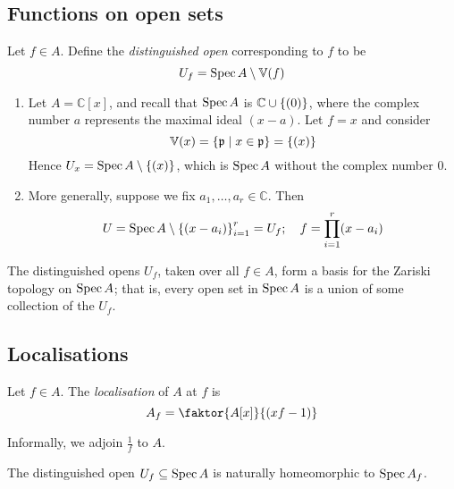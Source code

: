 \subsection{Functions on open sets}
\begin{definition}
    Let \( f \in A \).
    Define the \emph{distinguished open} corresponding to \( f \) to be
    \[ U_f = \operatorname{Spec} A \setminus \mathbb V(f) \]
\end{definition}
\begin{example}
    \begin{enumerate}
        \item Let \( A = \mathbb C[x] \), and recall that \( \operatorname{Spec} A \) is \( \mathbb C \cup \qty{(0)} \), where the complex number \( a \) represents the maximal ideal \( (x - a) \).
        Let \( f = x \) and consider
        \[ \mathbb V(x) = \qty{\mathfrak p \mid x \in \mathfrak p} = \qty{(x)} \]
        Hence \( U_x = \operatorname{Spec} A \setminus \qty{(x)} \), which is \( \operatorname{Spec} A \) without the complex number 0.
        \item More generally, suppose we fix \( a_1, \dots, a_r \in \mathbb C \).
        Then
        \[ U = \operatorname{Spec} A \setminus \qty{(x - a_i)}_{i=1}^r = U_f;\quad f = \prod_{i=1}^r (x-a_i) \]
    \end{enumerate}
\end{example}
\begin{lemma}
    The distinguished opens \( U_f \), taken over all \( f \in A \), form a basis for the Zariski topology on \( \operatorname{Spec} A \); that is, every open set in \( \operatorname{Spec} A \) is a union of some collection of the \( U_f \).
\end{lemma}

\subsection{Localisations}
\begin{definition}
    Let \( f \in A \).
    The \emph{localisation} of \( A \) at \( f \) is
    \[ A_f = \faktor{A[x]}{(xf - 1)} \]
\end{definition}
Informally, we adjoin \( \frac{1}{f} \) to \( A \).
\begin{lemma}
    The distinguished open \( U_f \subseteq \operatorname{Spec} A \) is naturally homeomorphic to \( \operatorname{Spec} A_f \).
\end{lemma}
